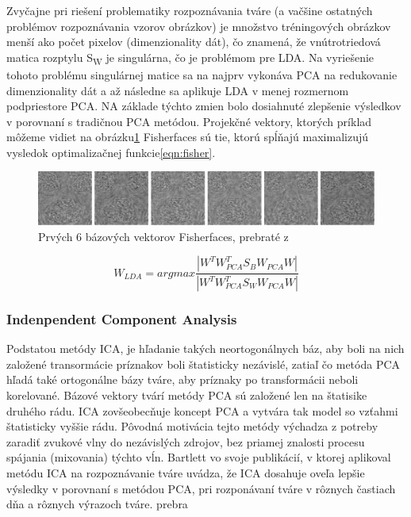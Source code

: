 Zvyčajne pri riešení problematiky rozpoznávania tváre (a vačšine ostatných problémov rozpoznávania vzorov obrázkov) je množstvo tréningových obrázkov menší ako počet pixelov
(dimenzionality dát), čo znamená, že vnútrotriedová matica rozptylu S\textsubscript{W} je singulárna, čo je problémom pre LDA.
Na vyriešenie tohoto problému singulárnej matice sa na najprv vykonáva PCA na redukovanie dimenzionality dát a
až následne sa aplikuje LDA v menej rozmernom podpriestore PCA.
NA základe týchto zmien bolo dosiahnuté zlepšenie výsledkov v porovnaní s tradičnou PCA metódou.
Projekčné vektory, ktorých príklad môžeme vidiet na obrázku\ref{fig:fisherfaces}  Fisherfaces sú tie, ktorú spĺňajú maximalizujú vysledok optimalizačnej funkcie\eqref{eqn:fisher}.

\begin{figure}[H]
	\centering
	\includegraphics[width=1\linewidth]{img/fisherfaces.png}
	\caption{Prvých 6 bázových vektorov Fisherfaces, prebraté z\cite[p.~46]{handbookbio}}
	\label{fig:fisherfaces}
\end{figure}

\begin{equation}\label{eqn:fisher}
	W_{LDA} = arg max \frac{|W^T W_{PCA}^T S_B W_{PCA} W|}{|W^T W_{PCA}^T S_W W_{PCA} W|}
\end{equation}

\subsubsection{Indenpendent Component Analysis}
Podstatou metódy ICA, je hľadanie takých neortogonálnych báz,
aby boli na nich založené transormácie príznakov boli štatisticky nezávislé, zatiaľ čo
metóda PCA hľadá také ortogonálne bázy tváre, aby príznaky po transformácii neboli korelované\cite{handbookbio}.
Bázové vektory tvárí metódy PCA sú založené len na štatisike druhého rádu.
ICA zovšeobecňuje koncept PCA a vytvára tak model so vzťahmi štatisticky vyššie rádu.
Pôvodná motivácia tejto metódy výchadza z potreby zaradiť zvukové vlny do nezávislých zdrojov, bez priamej znalosti procesu spájania
(mixovania) týchto vĺn\cite{handbookbio}. Bartlett vo svoje publikácií\cite{bartlett2002face}, v ktorej aplikoval metódu ICA
na rozpoznávanie tváre uvádza, že ICA dosahuje oveľa lepšie výsledky v porovnaní s metódou PCA, pri rozponávaní tváre v rôznych častiach dňa a rôznych výrazoch tváre.
prebra
